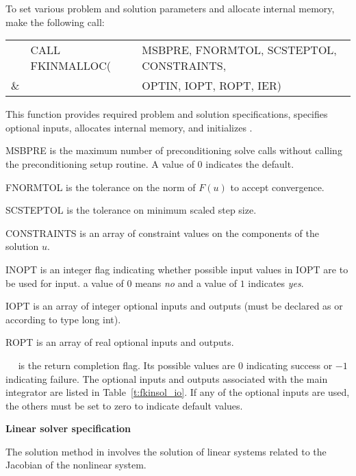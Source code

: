 \begin{Steps}
  To set various problem and solution parameters and allocate
  internal memory, make the following call:
  {
    \begin{tabular}[t]{@{}r@{}l@{}l@{}}
      &CALL FKINMALLOC(&MSBPRE, FNORMTOL, SCSTEPTOL, CONSTRAINTS, \\
    \&&                &OPTIN, IOPT, ROPT, IER)
    \end{tabular}
  }
  {
    This function provides required problem and solution specifications, 
    specifies optional inputs,
    allocates internal memory, and initializes {\kinsol}.
  }
  {
    \begin{args}[CONSTRAINTS]
    \item[MSBPRE] is the maximum number of preconditioning solve calls
      without calling the preconditioning setup routine.
      A value of $0$ indicates the default.
    \item[FNORMTOL] is the tolerance on the norm of $F(u)$ to accept convergence.
    \item[SCSTEPTOL] is the tolerance on minimum scaled step size.
    \item[CONSTRAINTS] is an array of constraint values on the components of the
      solution $u$.
    \item[INOPT] is an integer flag indicating whether possible
      input values in IOPT are to be used for input. a value of
      $0$ means {\em no} and a value of $1$ indicates {\em yes}.
    \item[IOPT] is an array of integer optional inputs and outputs
      (must be declared as  or  according to
      \C type long int).
    \item[ROPT] is an array of real optional inputs and outputs.
    \end{args}
  }
  {
    ~~ is the return completion flag. Its possible values are $0$ 
    indicating success or $-1$ indicating failure.
  }
  {
    The optional inputs and outputs associated with the main {\kinsol} integrator
    are listed in Table~\ref{t:fkinsol_io}.
    If any of the optional inputs are used, the others must be set
    to zero to indicate default values.
  }
  
\item\label{i:fkinsol_lin_solv_spec}{\bf Linear solver specification} 
  
  The solution method in {\kinsol} involves the solution of linear systems 
  related to the Jacobian of the nonlinear system.
  

\end{Steps}
